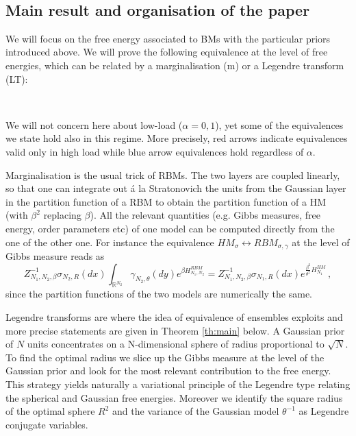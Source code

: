 \documentclass[10pt,oneside,a4paper,reqno]{amsart}  %
\def\a{\alpha}
\def\g{\gamma}
\def\b{\beta}
\def\r{\rho}
\def\s{\sigma}
\def\R{\mathbb{R}}
\theoremstyle{plain}
\numberwithin{equation}{section}
\begin{document}
\

\subsection{Main result and organisation of the paper}

We will focus on the free energy associated to BMs with the particular priors introduced above. 
We will prove the following equivalence at the level of free energies, which can be related by a marginalisation (m) or a Legendre transform (LT): 

\

\begin{center}
\end{center}

We will not concern here about low-load ($\a=0,1$), yet some of the equivalences we state hold also in this regime. More precisely, red arrows indicate equivalences valid only in high load while blue arrow equivalences hold regardless of $\a$.

Marginalisation is the usual trick of RBMs. The two layers are coupled linearly, so that one can integrate out \'a la Stratonovich the units from the Gaussian layer in the partition function of a RBM to obtain the partition function of a HM (with $\b^2$ replacing $\b$). 
All the relevant quantities (e.g. Gibbs measures, free energy, order parameters etc) of one model can be computed directly from the one of the other one. For instance the equivalence $HM_\s\leftrightarrow RBM_{\s,\g}$ at the level of Gibbs measure reads as
$$
Z^{-1}_{N_1,N_2,\b}\s_{N_2,R}(dx)\int_{\R^{N_2}}\g_{N_2,\theta}(dy)e^{\b H_{N_1,N_2}^{RBM}}=Z^{-1}_{N_1,N_2,\b}\s_{N_1,R}(dx)e^{\frac{\b^2}{\theta^2} H^{HM}_{N_1}}\,,
$$
since the  partition functions of the two models are numerically the same.


Legendre transforms are where the idea of equivalence of ensembles exploits and more precise statements are given in Theorem \ref{th:main} below. A Gaussian prior of $N$ units concentrates on a N-dimensional sphere of radius proportional to $\sqrt N$. To find the optimal radius we slice up the Gibbs measure at the level of the Gaussian prior and look for the most relevant contribution to the free energy. This strategy yields naturally a variational principle of the Legendre type relating the spherical and Gaussian free energies. Moreover we identify the square radius of the optimal sphere $R^2$ and the variance of the Gaussian model $\theta^{-1}$ as Legendre conjugate variables. 
\end{document}
